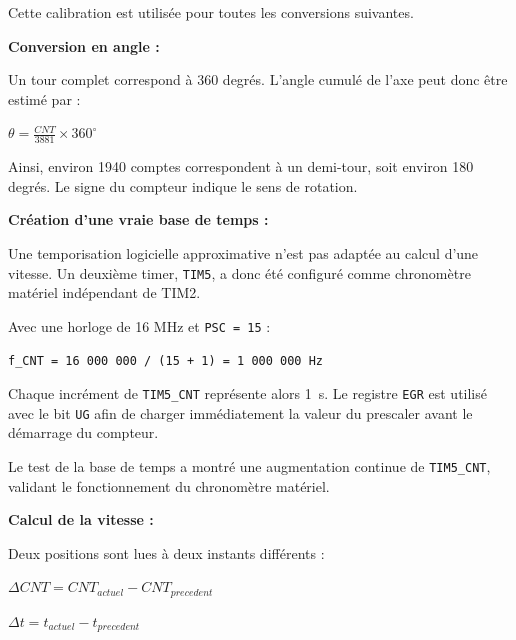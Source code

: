 \documentclass[11pt,a4paper]{article}
\begin{document}
\begin{sessionbox}
		Cette calibration est utilisée pour toutes les conversions suivantes.
		
		\vspace{0.3cm}
		
		\textbf{Conversion en angle :}
		
		Un tour complet correspond à 360 degrés. L'angle cumulé de l'axe peut donc être estimé par :
		
		\begin{center}
			$\theta = \frac{CNT}{3881} \times 360^\circ$
		\end{center}
		
		Ainsi, environ 1940 comptes correspondent à un demi-tour, soit environ 180 degrés. Le signe du compteur indique le sens de rotation.
		
		\vspace{0.3cm}
		
		\textbf{Création d'une vraie base de temps :}
		
		Une temporisation logicielle approximative n'est pas adaptée au calcul d'une vitesse. Un deuxième timer, \texttt{TIM5}, a donc été configuré comme chronomètre matériel indépendant de TIM2.
		
		Avec une horloge de 16 MHz et \texttt{PSC = 15} :
		
		\begin{center}
			\texttt{f\_CNT = 16 000 000 / (15 + 1) = 1 000 000 Hz}
		\end{center}
		
		Chaque incrément de \texttt{TIM5\_CNT} représente alors 1~\textmu s. Le registre \texttt{EGR} est utilisé avec le bit \texttt{UG} afin de charger immédiatement la valeur du prescaler avant le démarrage du compteur.
		
		Le test de la base de temps a montré une augmentation continue de \texttt{TIM5\_CNT}, validant le fonctionnement du chronomètre matériel.
		
		\vspace{0.3cm}
		
		\textbf{Calcul de la vitesse :}
		
		Deux positions sont lues à deux instants différents :
		
		\begin{center}
			$\Delta CNT = CNT_{actuel} - CNT_{precedent}$
		\end{center}
		
		\begin{center}
			$\Delta t = t_{actuel} - t_{precedent}$
		\end{center}
		

\end{sessionbox}
\end{document}
